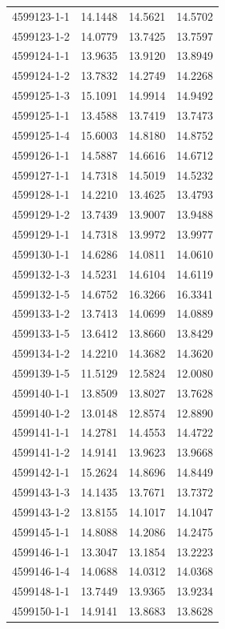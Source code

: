 \begin{longtable}{lrrr}
4599123-1-1 & 14.1448 & 14.5621 & 14.5702 \\
4599123-1-2 & 14.0779 & 13.7425 & 13.7597 \\
4599124-1-1 & 13.9635 & 13.9120 & 13.8949 \\
4599124-1-2 & 13.7832 & 14.2749 & 14.2268 \\
4599125-1-3 & 15.1091 & 14.9914 & 14.9492 \\
4599125-1-1 & 13.4588 & 13.7419 & 13.7473 \\
4599125-1-4 & 15.6003 & 14.8180 & 14.8752 \\
4599126-1-1 & 14.5887 & 14.6616 & 14.6712 \\
4599127-1-1 & 14.7318 & 14.5019 & 14.5232 \\
4599128-1-1 & 14.2210 & 13.4625 & 13.4793 \\
4599129-1-2 & 13.7439 & 13.9007 & 13.9488 \\
4599129-1-1 & 14.7318 & 13.9972 & 13.9977 \\
4599130-1-1 & 14.6286 & 14.0811 & 14.0610 \\
4599132-1-3 & 14.5231 & 14.6104 & 14.6119 \\
4599132-1-5 & 14.6752 & 16.3266 & 16.3341 \\
4599133-1-2 & 13.7413 & 14.0699 & 14.0889 \\
4599133-1-5 & 13.6412 & 13.8660 & 13.8429 \\
4599134-1-2 & 14.2210 & 14.3682 & 14.3620 \\
4599139-1-5 & 11.5129 & 12.5824 & 12.0080 \\
4599140-1-1 & 13.8509 & 13.8027 & 13.7628 \\
4599140-1-2 & 13.0148 & 12.8574 & 12.8890 \\
4599141-1-1 & 14.2781 & 14.4553 & 14.4722 \\
4599141-1-2 & 14.9141 & 13.9623 & 13.9668 \\
4599142-1-1 & 15.2624 & 14.8696 & 14.8449 \\
4599143-1-3 & 14.1435 & 13.7671 & 13.7372 \\
4599143-1-2 & 13.8155 & 14.1017 & 14.1047 \\
4599145-1-1 & 14.8088 & 14.2086 & 14.2475 \\
4599146-1-1 & 13.3047 & 13.1854 & 13.2223 \\
4599146-1-4 & 14.0688 & 14.0312 & 14.0368 \\
4599148-1-1 & 13.7449 & 13.9365 & 13.9234 \\
4599150-1-1 & 14.9141 & 13.8683 & 13.8628 \\

\end{longtable}
